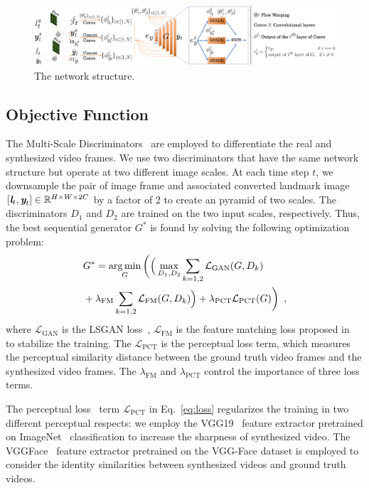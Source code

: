\documentclass[runningheads]{llncs}
\DeclareMathOperator*{\argminA}{arg\,min} %
\def\mathbi#1{\textbf{\em #1}}
\begin{document}
 \begin{figure}[t]
\includegraphics[width= \linewidth]{latex/images/3dgan.png}
\centering
\caption{The network structure.}
\label{fig:composite}
\end{figure}
\subsection{Objective Function}
\label{subsec:loss}

The Multi-Scale Discriminators~\cite{wang2018high} are employed to differentiate the real and synthesized video frames. We use two discriminators that have the same network structure but operate at two different image scales. At each time step $t$, we downsample the pair of image frame and associated converted landmark image $[\mathbi{l}_{t}, \mathbi{y}_{t}] \in \mathbb{R}^{H\times W \times 2C} $ by a factor of 2 to create an pyramid of two scales. The discriminators $D_1$ and $D_2$ are trained on the two input scales, respectively. Thus, the best sequential generator $G^*$ is found by solving the following optimization problem:
\begin{equation}
\begin{aligned}
& G^* = \argminA_G\bigg{(} \Big{(} \max_{D_1,D_2}\sum_{k=1,2} \mathcal{L}_{\text{GAN}}(G,D_k) \\
& + \lambda_{\text{FM}} \sum_{k=1,2} \mathcal{L}_{\text{FM}}(G,D_k) \Big{)} + \lambda_{\text{PCT}} \mathcal{L}_{\text{PCT}}(G)\bigg{)}  \enspace,
\end{aligned}
\label{eq:loss}    
\end{equation}
where $\mathcal{L}_{\text{GAN}}$ is the LSGAN loss~\cite{mao2017least}, $\mathcal{L}_{\text{FM}}$ is the feature matching loss proposed in 
~\cite{wang2018high} to stabilize the training. The $\mathcal{L}_{\text{PCT}}$ is the perceptual loss term, which measures the perceptual similarity distance between the ground truth video frames and the synthesized video frames. The $\lambda_{\text{FM}}$ and $\lambda_{\text{PCT}}$ control the importance of three loss terms. 

The perceptual loss~\cite{johnson2016perceptual} term $\mathcal{L}_{\text{PCT}}$ in Eq.~\ref{eq:loss} regularizes the training in two different perceptual respects: we employ the VGG19~\cite{Simonyan15} feature extractor pretrained on ImageNet~\cite{deng2009imagenet} classification to increase the sharpness of synthesized video. The VGGFace~\cite{parkhi2015deep} feature extractor pretrained on the VGG-Face dataset is employed to consider the identity similarities between synthesized videos and ground truth videos.  
\end{document}
